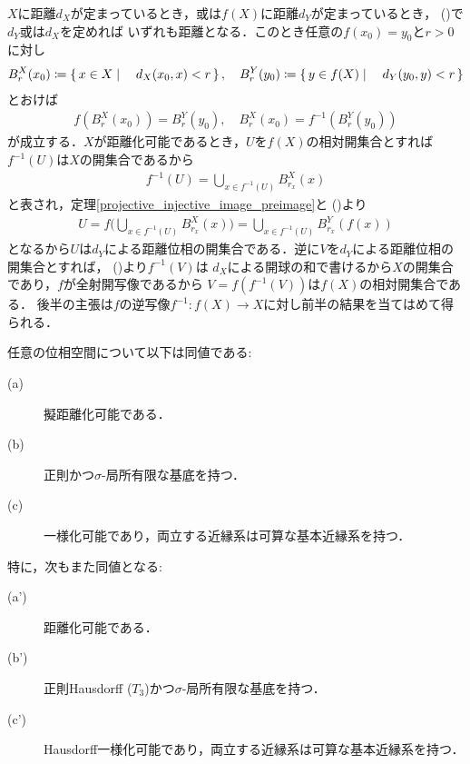 	\begin{prf}
		$X$に距離$d_X$が定まっているとき，或は$f(X)$に距離$d_Y$が定まっているとき，
		()で$d_Y$或は$d_X$を定めれば
		いずれも距離となる．このとき任意の$f(x_0) = y_0$と$r > 0$に対し
		\begin{align}
			B^X_r(x_0) \coloneqq \left\{\, x \in X \mid \quad d_X(x_0,x) < r\, \right\},
			\quad B^Y_r(y_0) \coloneqq \left\{\, y \in f(X) \mid \quad d_Y(y_0,y) < r\, \right\}
		\end{align}
		とおけば
		\begin{align}
			f\left(B^X_r(x_0)\right) = B^Y_r(y_0),
			\quad B^X_r(x_0) = f^{-1}\left(B^Y_r(y_0)\right)
			\label{eq:thm_heredity_of_metrizability_2}
		\end{align}
		が成立する．$X$が距離化可能であるとき，$U$を$f(X)$の相対開集合とすれば
		$f^{-1}(U)$は$X$の開集合であるから
		\begin{align}
			f^{-1}(U) = \bigcup_{x \in f^{-1}(U)}B^X_{r_x}(x)
		\end{align}
		と表され，定理\ref{projective_injective_image_preimage}と
		()より
		\begin{align}
			U = f\Biggl(\bigcup_{x \in f^{-1}(U)}B^X_{r_x}(x)\Biggr)
			= \bigcup_{x \in f^{-1}(U)}B^Y_{r_x}(f(x))
		\end{align}
		となるから$U$は$d_Y$による距離位相の開集合である．逆に$V$を$d_Y$による距離位相の開集合とすれば，
		()より$f^{-1}(V)$は
		$d_X$による開球の和で書けるから$X$の開集合であり，$f$が全射開写像であるから
		$V = f\left(f^{-1}(V)\right)$は$f(X)$の相対開集合である．
		後半の主張は$f$の逆写像$f^{-1}:f(X) \longrightarrow X$に対し前半の結果を当てはめて得られる．
		\QED
	\end{prf}
	
	\begin{screen}
		\begin{thm}[距離化可能性の同値条件]\label{thm:Nagata_Smirnov_metrizability}
			任意の位相空間について以下は同値である:
			\begin{description}
				\item[(a)] 擬距離化可能である．
				\item[(b)] 正則かつ$\sigma$-局所有限な基底を持つ．
				\item[(c)] 一様化可能であり，両立する近縁系は可算な基本近縁系を持つ．
			\end{description}
			特に，次もまた同値となる:
			\begin{description}
				\item[(a')] 距離化可能である．
				\item[(b')] 正則Hausdorff
					($T_3$)かつ$\sigma$-局所有限な基底を持つ．
				\item[(c')] Hausdorff一様化可能であり，両立する近縁系は可算な基本近縁系を持つ．
			\end{description}
		\end{thm}
	\end{screen}
	
